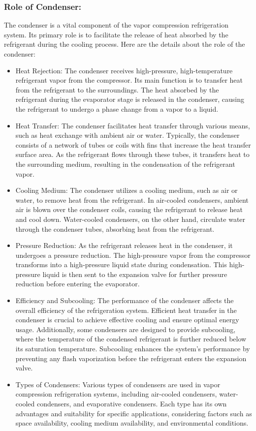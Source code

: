 \documentclass{article}
\begin{document}
\subsubsection*{Role of Condenser:}
The condenser is a vital component of the vapor compression refrigeration system. Its primary role is to facilitate the release of heat absorbed by the refrigerant during the cooling process. Here are the details about the role of the condenser:

\begin{itemize}
  \item Heat Rejection: The condenser receives high-pressure, high-temperature refrigerant vapor from the compressor. Its main function is to transfer heat from the refrigerant to the surroundings. The heat absorbed by the refrigerant during the evaporator stage is released in the condenser, causing the refrigerant to undergo a phase change from a vapor to a liquid.
  \item Heat Transfer: The condenser facilitates heat transfer through various means, such as heat exchange with ambient air or water. Typically, the condenser consists of a network of tubes or coils with fins that increase the heat transfer surface area. As the refrigerant flows through these tubes, it transfers heat to the surrounding medium, resulting in the condensation of the refrigerant vapor.
  \item Cooling Medium: The condenser utilizes a cooling medium, such as air or water, to remove heat from the refrigerant. In air-cooled condensers, ambient air is blown over the condenser coils, causing the refrigerant to release heat and cool down. Water-cooled condensers, on the other hand, circulate water through the condenser tubes, absorbing heat from the refrigerant.
  \item Pressure Reduction: As the refrigerant releases heat in the condenser, it undergoes a pressure reduction. The high-pressure vapor from the compressor transforms into a high-pressure liquid state during condensation. This high-pressure liquid is then sent to the expansion valve for further pressure reduction before entering the evaporator.
  \item Efficiency and Subcooling: The performance of the condenser affects the overall efficiency of the refrigeration system. Efficient heat transfer in the condenser is crucial to achieve effective cooling and ensure optimal energy usage. Additionally, some condensers are designed to provide subcooling, where the temperature of the condensed refrigerant is further reduced below its saturation temperature. Subcooling enhances the system's performance by preventing any flash vaporization before the refrigerant enters the expansion valve.
  \item Types of Condensers: Various types of condensers are used in vapor compression refrigeration systems, including air-cooled condensers, water-cooled condensers, and evaporative condensers. Each type has its own advantages and suitability for specific applications, considering factors such as space availability, cooling medium availability, and environmental conditions.
\end{itemize}
\end{document}
